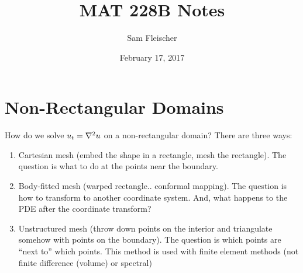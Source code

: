 \documentclass{article}
\title{MAT 228B Notes}
\author{Sam Fleischer}
\date{February 17, 2017}
\begin{document}
    \maketitle

    \section{Non-Rectangular Domains}
        How do we solve $u_t = \laplacian u$ on a non-rectangular domain?  There are three ways:
        \begin{enumerate}[\ \ (a)]
            \item Cartesian mesh (embed the shape in a rectangle, mesh the rectangle).  The question is what to do at the points near the boundary.
            \item Body-fitted mesh (warped rectangle.. conformal mapping).  The question is how to transform to another coordinate system.  And, what happens to the PDE after the coordinate transform?
            \item Unstructured mesh (throw down points on the interior and triangulate somehow with points on the boundary).  The question is which points are ``next to'' which points.  This method is used with finite element methods (not finite difference (volume) or spectral)
        \end{enumerate}
\end{document}
